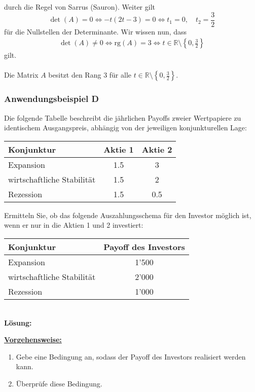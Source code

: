 durch die Regel von Sarrus (Sauron).
Weiter gilt
\begin{equation*}
\det(A) = 0 
\Leftrightarrow
-t ( 2 t - 3) = 0 
\Leftrightarrow
t_1 = 0, \quad t_2 = \frac{3}{2}
\end{equation*}
für die Nullstellen der Determinante.
Wir wissen nun, dass 
\begin{align*}
\det(A) \neq 0 
\Leftrightarrow
\text{rg}(A) = 3 
\Leftrightarrow
t \in \mathbb{R} \setminus \left\lbrace 0, \frac{3}{2} \right\rbrace
\end{align*}
gilt.\\
\\
Die Matrix $A$ besitzt den Rang $3$ für alle $t \in \mathbb{R} \setminus \left\lbrace 0, \frac{3}{2} \right\rbrace$.
\newpage
\subsubsection*{Anwendungsbeispiel D}
Die folgende Tabelle beschreibt die jährlichen Payoffs zweier Wertpapiere zu identischem Ausgangspreis,
abhängig von der jeweiligen konjunkturellen Lage:
\begin{table}[H]
\centering
\begin{tabular}{lcc}
\hline 
Konjunktur & Aktie 1 & Aktie 2 \\ 
\hline 
Expansion & 1.5 & 3 \\ 
wirtschaftliche Stabilität & 1.5 & 2 \\ 
Rezession & 1.5 & 0.5 \\ 
\hline 
\end{tabular} 
\end{table}
Ermitteln Sie, ob das folgende Auszahlungsschema für den Investor möglich ist,
wenn er nur in die Aktien 1 und 2 investiert:
\begin{table}[H]
\centering
\begin{tabular}{lc}
\hline 
Konjunktur & Payoff des Investors \\ 
\hline 
Expansion & 1'500 \\ 
wirtschaftliche Stabilität & 2'000 \\ 
Rezession & 1'000 \\ 
\hline 
\end{tabular} 
\end{table}
\ \\
\textbf{Lösung:}
\begin{mdframed}
\underline{\textbf{Vorgehensweise:}}
\begin{enumerate}
\renewcommand{\labelenumi}{\theenumi.}
\item Gebe eine Bedingung an, sodass der Payoff des Investors realisiert werden kann.
\item Überprüfe diese Bedingung.
\end{enumerate}
\end{mdframed}

